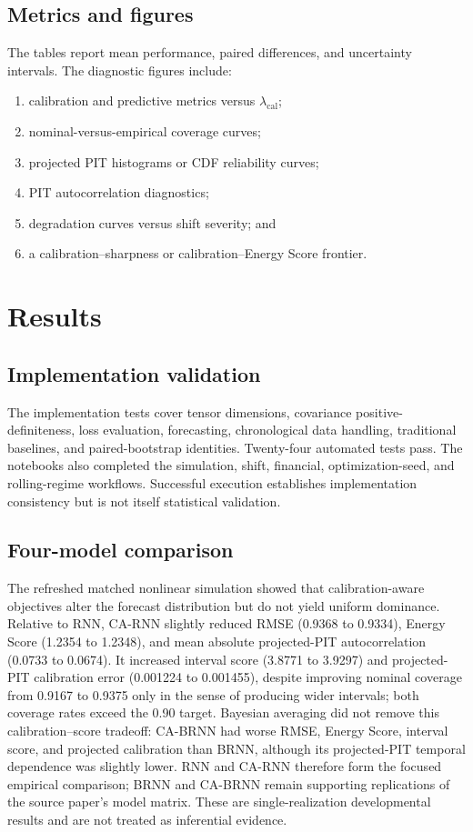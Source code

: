 \documentclass[11pt]{article}
\begin{document}
\subsection{Metrics and figures}

The tables report mean performance, paired differences, and uncertainty
intervals. The diagnostic figures include:
\begin{enumerate}
    \item calibration and predictive metrics versus $\lambda_{\mathrm{cal}}$;
    \item nominal-versus-empirical coverage curves;
    \item projected PIT histograms or CDF reliability curves;
    \item PIT autocorrelation diagnostics;
    \item degradation curves versus shift severity; and
    \item a calibration--sharpness or calibration--Energy Score frontier.
\end{enumerate}

\section{Results}

\subsection{Implementation validation}

The implementation tests cover tensor dimensions, covariance
positive-definiteness, loss evaluation, forecasting, chronological data handling,
traditional baselines, and paired-bootstrap identities. Twenty-four automated
tests pass. The notebooks also
completed the simulation, shift, financial, optimization-seed, and rolling-regime
workflows. Successful execution establishes implementation consistency but is not
itself statistical validation.

\subsection{Four-model comparison}

The refreshed matched nonlinear simulation showed that calibration-aware
objectives alter the forecast distribution but do not yield uniform dominance.
Relative to RNN, CA-RNN slightly reduced RMSE (0.9368 to 0.9334), Energy Score
(1.2354 to 1.2348), and mean absolute projected-PIT autocorrelation (0.0733 to
0.0674). It increased interval score (3.8771 to 3.9297) and projected-PIT
calibration error (0.001224 to 0.001455), despite improving nominal coverage
from 0.9167 to 0.9375 only in the sense of producing wider intervals; both
coverage rates exceed the 0.90 target. Bayesian averaging did not remove this
calibration--score tradeoff: CA-BRNN had worse RMSE, Energy Score, interval
score, and projected calibration than BRNN, although its projected-PIT temporal
dependence was slightly lower. RNN and CA-RNN therefore form the focused
empirical comparison; BRNN and CA-BRNN remain supporting replications of the
source paper's model matrix. These are single-realization developmental results
and are not treated as inferential evidence.
\end{document}
